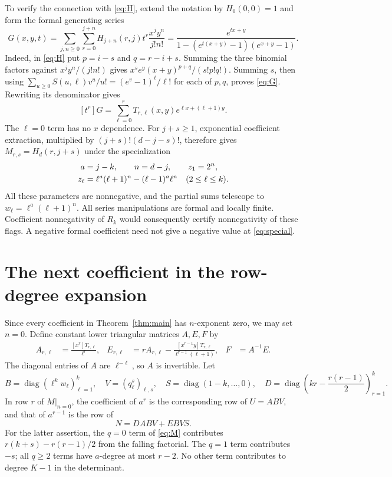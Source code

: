 \documentclass[11pt]{article}
\newcommand{\diag}{\operatorname{diag}}
\newcommand{\coef}[1]{\left[#1\right]}
\begin{document}
To verify the connection with \eqref{eq:H}, extend the notation by
$H_0(0,0)=1$ and form the formal generating series
\begin{equation}\label{eq:G}
 G(x,y,t)=\sum_{j,n\geq0}\sum_{r=0}^{j+n}
 H_{j+n}(r,j)t^r\frac{x^jy^n}{j!n!}
 =\frac{e^{tx+y}}{1-(e^{t(x+y)}-1)(e^{x+y}-1)}.
\end{equation}
Indeed, in \eqref{eq:H} put $p=i-s$ and $q=r-i+s$. Summing the three
binomial factors against $x^jy^n/(j!n!)$ gives
$x^s e^y(x+y)^{p+q}/(s!p!q!)$.
Summing $s$, then using
$\sum_{u\geq0}S(u,\ell)v^u/u!=(e^v-1)^\ell/\ell!$
for each of $p,q$, proves \eqref{eq:G}.
Rewriting its denominator gives
\[
 \coef{t^r}G=\sum_{\ell=0}^r
 T_{r,\ell}(x,y)e^{\ell x+(\ell+1)y}.
\]
The $\ell=0$ term has no $x$ dependence. For $j+s\geq1$, exponential
coefficient extraction, multiplied by $(j+s)!(d-j-s)!$, therefore gives
$M_{r,s}=H_d(r,j+s)$ under the specialization
\begin{align}
 a&=j-k,\qquad n=d-j,\qquad z_1=2^n,\label{eq:special}\\
 z_\ell&=\ell^a(\ell+1)^n-(\ell-1)^a\ell^n\quad(2\leq\ell\leq k).
 \notag
\end{align}
All these parameters are nonnegative, and the partial sums telescope to
$w_\ell=\ell^a(\ell+1)^n$. All series manipulations are formal and locally
finite. Coefficient nonnegativity of $R_k$ would consequently certify
nonnegativity of these flags. A negative formal coefficient need not give
a negative value at \eqref{eq:special}.

\section{The next coefficient in the row-degree expansion}

Since every coefficient in Theorem~\ref{thm:main} has $n$-exponent zero,
we may set $n=0$. Define constant lower triangular matrices $A,E,F$ by
\begin{align}
 A_{r,\ell}&=\frac{\coef{x^r}T_{r,\ell}}{\ell^r},&
 E_{r,\ell}&=rA_{r,\ell}
 -\frac{\coef{x^{r-1}y}T_{r,\ell}}{\ell^{r-1}(\ell+1)},&
 F&=A^{-1}E.\label{eq:AE}
\end{align}
The diagonal entries of $A$ are $\ell^{-\ell}$, so $A$ is invertible.
Let
\[
 B=\diag(\ell^k w_\ell)_{\ell=1}^k,\quad
 V=(q_\ell^s)_{\ell,s},\quad S=\diag(1-k,\ldots,0),\quad
 D=\diag\left(kr-\frac{r(r-1)}2\right)_{r=1}^k.
\]
In row $r$ of $M|_{n=0}$, the coefficient of $a^r$ is the corresponding
row of $U=ABV$, and that of $a^{r-1}$ is the row of
\begin{equation}\label{eq:N}
 N=DABV+EBVS.
\end{equation}
For the latter assertion, the $q=0$ term of \eqref{eq:M} contributes
$r(k+s)-r(r-1)/2$ from the falling factorial. The $q=1$ term contributes
$-s$; all $q\geq2$ terms have $a$-degree at most $r-2$.
No other term contributes to degree $K-1$ in the determinant.
\end{document}
